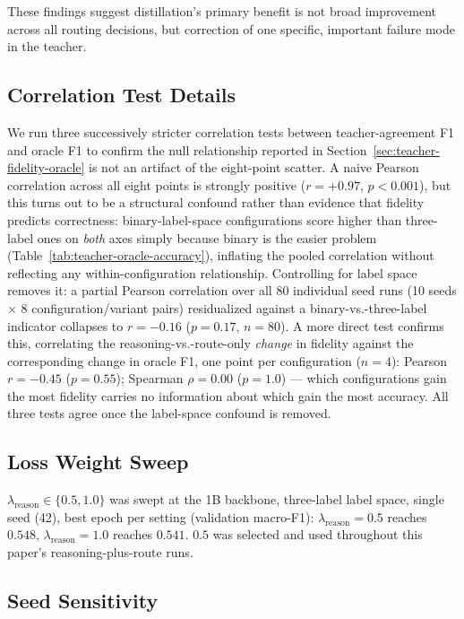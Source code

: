 \documentclass{article}
\begin{document}
These findings suggest distillation's primary benefit is not broad
improvement across all routing decisions, but correction of one
specific, important failure mode in the teacher.

\subsection{Correlation Test Details}
\label{sec:correlation-appendix}

We run three successively stricter correlation tests between
teacher-agreement F1 and oracle F1 to confirm the null relationship
reported in Section~\ref{sec:teacher-fidelity-oracle} is not an
artifact of the eight-point scatter. A naive Pearson correlation
across all eight points is strongly positive ($r = +0.97$,
$p < 0.001$), but this turns out to be a structural confound rather
than evidence that fidelity predicts correctness: binary-label-space
configurations score higher than three-label ones on \emph{both} axes
simply because binary is the easier problem
(Table~\ref{tab:teacher-oracle-accuracy}), inflating the pooled correlation without
reflecting any within-configuration relationship. Controlling for
label space removes it: a partial Pearson correlation over all 80
individual seed runs (10 seeds $\times$ 8 configuration/variant pairs)
residualized against a binary-vs.-three-label indicator collapses to
$r = -0.16$ ($p = 0.17$, $n = 80$). A more direct test confirms this,
correlating the reasoning-vs.-route-only \emph{change} in fidelity
against the corresponding change in oracle F1, one point per
configuration ($n = 4$): Pearson $r = -0.45$ ($p = 0.55$); Spearman
$\rho = 0.00$ ($p = 1.0$) — which configurations gain the most fidelity
carries no information about which gain the most accuracy. All three
tests agree once the label-space confound is removed.

\subsection{Loss Weight Sweep}
\label{sec:loss-weighting}

$\lambda_{\text{reason}} \in \{0.5, 1.0\}$ was swept at the 1B
backbone, three-label label space, single seed (42), best epoch per setting
(validation macro-F1): $\lambda_{\text{reason}} = 0.5$ reaches
$0.548$, $\lambda_{\text{reason}} = 1.0$ reaches $0.541$. $0.5$ was
selected and used throughout this paper's reasoning-plus-route runs.

\subsection{Seed Sensitivity}
\label{sec:seed-variance}
\end{document}
